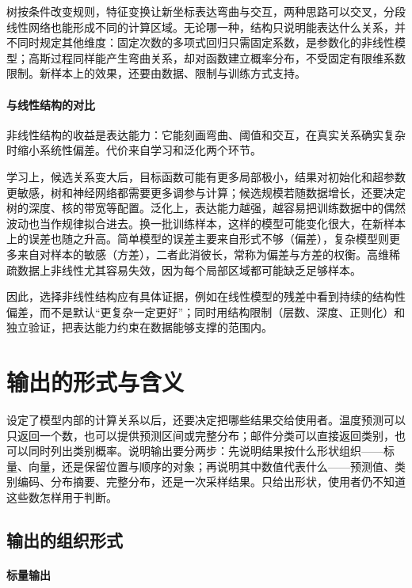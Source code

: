 树按条件改变规则，特征变换让新坐标表达弯曲与交互，两种思路可以交叉，分段线性网络也能形成不同的计算区域。无论哪一种，结构只说明能表达什么关系，并不同时规定其他维度：固定次数的多项式回归只需固定系数，是参数化的非线性模型；高斯过程同样能产生弯曲关系，却对函数建立概率分布，不受固定有限维系数限制。新样本上的效果，还要由数据、限制与训练方式支持。

\paragraph{与线性结构的对比}

非线性结构的收益是表达能力：它能刻画弯曲、阈值和交互，在真实关系确实复杂时缩小系统性偏差。代价来自学习和泛化两个环节。

学习上，候选关系变大后，目标函数可能有更多局部极小，结果对初始化和超参数更敏感，树和神经网络都需要更多调参与计算；候选规模若随数据增长，还要决定树的深度、核的带宽等配置。泛化上，表达能力越强，越容易把训练数据中的偶然波动也当作规律拟合进去。换一批训练样本，这样的模型可能变化很大，在新样本上的误差也随之升高。简单模型的误差主要来自形式不够（偏差），复杂模型则更多来自对样本的敏感（方差），二者此消彼长，常称为偏差与方差的权衡。高维稀疏数据上非线性尤其容易失效，因为每个局部区域都可能缺乏足够样本。

因此，选择非线性结构应有具体证据，例如在线性模型的残差中看到持续的结构性偏差，而不是默认“更复杂一定更好”；同时用结构限制（层数、深度、正则化）和独立验证，把表达能力约束在数据能够支撑的范围内。

\FloatBarrier
\section{输出的形式与含义}
\label{sec:models-output}

设定了模型内部的计算关系以后，还要决定把哪些结果交给使用者。温度预测可以只返回一个数，也可以提供预测区间或完整分布；邮件分类可以直接返回类别，也可以同时列出类别概率。说明输出要分两步：先说明结果按什么形状组织——标量、向量，还是保留位置与顺序的对象；再说明其中数值代表什么——预测值、类别编码、分布摘要、完整分布，还是一次采样结果。只给出形状，使用者仍不知道这些数怎样用于判断。

\subsection{输出的组织形式}
\label{sec:models-output-form}

\paragraph{标量输出}
\label{sec:models-scalar-output}

